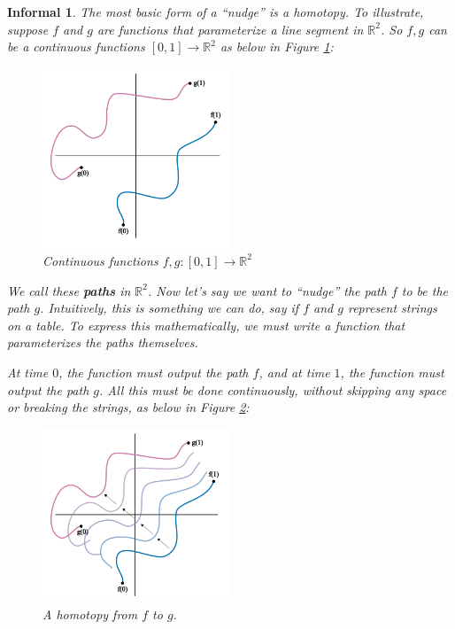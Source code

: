 \documentclass{amsart}
\newtheorem*{informal}{Informal}
\begin{document}
\begin{definition}[Homotopy]\label{homotopy}
   \begin{informal}
		The most basic form of a ``nudge'' is a \emph{homotopy}. To illustrate,
		suppose \(f\)  and \(g\) are functions that parameterize a line segment in
		\(\mathbb{R}^2\). So \(f, g\) can be a continuous functions \([0,
		1]\to\mathbb{R}^2\) as below in Figure \ref{2paths}: 
		\begin{figure}[!h]
		   \centering
			\includegraphics[width = 0.5\textwidth]{Inkscape Files/2lines.png}
			\caption{Continuous functions \(f, g: [0, 1]\to \mathbb{R}^2\)}
			\label{2paths}
		\end{figure}    

		We call these \textbf{paths} in \(\mathbb{R}^2\). Now let's say we want
		to ``nudge'' the path \(f\) to be the path \(g\). Intuitively, this is
		something we can do, say if \(f\) and \(g\) represent strings on a table.
		To express this mathematically, we must write a function that
		parameterizes the paths themselves.

		At time \(0\), the function must output the path \(f\), and at time
		\(1\), the function must output the path \(g\). All this must be done
		continuously, without skipping any space or breaking the strings, as
		below in Figure \ref{interpolated-paths}:
		\begin{figure}[!h]
		   \centering
			\includegraphics[width = 0.5\textwidth]
			{Inkscape Files/interpolated-paths.png}
			\caption{A homotopy from \(f\) to \(g\).}
			\label{interpolated-paths}
		\end{figure}


\end{informal}
\end{definition}
\end{document}
